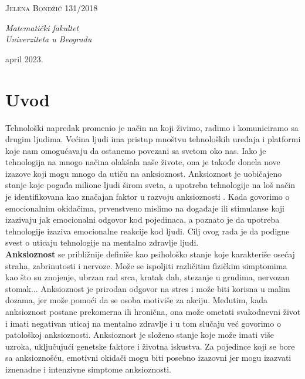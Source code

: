 \documentclass[a4paper]{article}
\begin{document}
\begin{titlepage}
	{\scshape\Large Jelena Bondžić 131/2018 \\} %
	
	\vspace{0.5\baselineskip} %
	
	\textit{Matematički fakultet \\ Univerziteta u Beogradu} %
	
	\vfill %
	
	
	
	\vspace{0.3\baselineskip} %
	
	april 2023. %
	

\end{titlepage}
 

	
\newpage	
    
\tableofcontents
		
\newpage
		
\section{Uvod}
\label{sec:uvod}
	Tehnološki napredak promenio je način na koji živimo, radimo i komuniciramo sa drugim ljudima. Većina ljudi ima pristup mnoštvu tehnoloških uređaja i platformi koje nam omogućavaju da ostanemo povezani sa svetom oko nas. Iako je tehnologija na mnogo načina olakšala naše živote, ona je takođe donela nove izazove koji mogu mnogo da utiču na anksioznost. Anksioznost je uobičajeno stanje koje pogađa milione ljudi širom sveta, a  upotreba tehnologije na loš način je identifikovana kao značajan faktor u razvoju anksioznosti \cite{prva}. Kada govorimo o emocionalnim okidačima, prvenstveno mislimo na događaje ili stimulanse koji izazivaju jak emocionalni odgovor kod pojedinaca, a poznato je da upotreba tehnologije izaziva emocionalne reakcije kod ljudi. Cilj ovog rada je da podigne svest o uticaju tehnologije na mentalno zdravlje ljudi. \\
 
     \textbf{Anksioznost} se približnije definiše kao psihološko stanje koje karakteriše osećaj straha, zabrinutosti i nervoze. Može se ispoljiti različitim fizičkim simptomima kao što su znojenje, ubrzan rad srca, kratak dah, stezanje u grudima, nervozan stomak... Anksioznost je prirodan odgovor na stres i može biti korisna u malim dozama, jer može pomoći da se osoba motiviše za akciju. Međutim, kada anksioznost postane prekomerna ili hronična, ona može ometati svakodnevni život i imati negativan uticaj na mentalno zdravlje i u tom slučaju već govorimo o patološkoj anksioznosti. Anksioznost je složeno stanje koje može imati više uzroka, uključujući genetske faktore i životna iskustva. Za pojedince koji se bore sa anksioznošću, emotivni okidači mogu biti posebno izazovni jer mogu izazvati iznenadne i intenzivne simptome anksioznosti. \\
    
\end{document}
